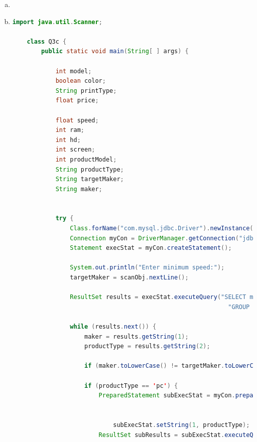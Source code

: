 \documentclass[12pt]{article}
\begin{document}
\begin{enumerate}[1.]
\begin{enumerate}[a)]
\begin{lstlisting}[language=JAVA]
                            printf("model=%d, color=%s, price=%.2f, maker=%c, type=%s",
                            model, color ? "true" : "false", price, maker, type);
                        }
                    }
                }

            } catch (SQLException ex) {
                // handle the error
                System.out.println("Error occured while establishing database connection");
            }
        }
    }
    \end{lstlisting}

        \item

        \item

    \begin{lstlisting}[language=JAVA]
    import java.util.Scanner;

    class Q3c {
        public static void main(String[ ] args) {

            int model;
            boolean color;
            String printType;
            float price;

            float speed;
            int ram;
            int hd;
            int screen;
            int productModel;
            String productType;
            String targetMaker;
            String maker;


            try {
                Class.forName("com.mysql.jdbc.Driver").newInstance();
                Connection myCon = DriverManager.getConnection("jdbc:mysql://localhost/Q3");
                Statement execStat = myCon.createStatement();

                System.out.println("Enter minimum speed:");
                targetMaker = scanObj.nextLine();

                ResultSet results = execStat.executeQuery("SELECT maker, productType FROM Product" +
                                                            "GROUP BY maker, productType");

                while (results.next()) {
                    maker = results.getString(1);
                    productType = results.getString(2);

                    if (maker.toLowerCase() != targetMaker.toLowerCase()) continue;

                    if (productType == 'pc') {
                        PreparedStatement subExecStat = myCon.prepareStatement("SELECT speed, ram, hd, price FROM PC " +
                                                                                "NATURAL JOIN Product " +
                                                                                "WHERE type= ?");
                            subExecStat.setString(1, productType);
                        ResultSet subResults = subExecStat.executeQuery();


\end{lstlisting}
\end{enumerate}
\end{enumerate}
\end{document}
